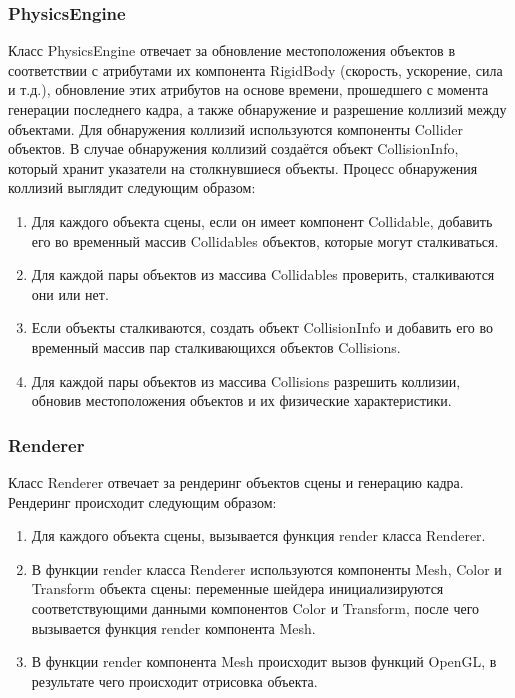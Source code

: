 \subsubsection*{PhysicsEngine}

Класс PhysicsEngine отвечает за обновление местоположения объектов в соответствии с атрибутами их компонента RigidBody (скорость, ускорение, сила и т.д.), обновление этих атрибутов на основе времени, прошедшего с момента генерации последнего кадра, а также обнаружение и разрешение коллизий между объектами.
Для обнаружения коллизий используются компоненты Collider объектов.
В случае обнаружения коллизий создаётся объект CollisionInfo, который хранит указатели на столкнувшиеся объекты.
Процесс обнаружения коллизий выглядит следующим образом:
\begin{enumerate}
    \item Для каждого объекта сцены, если он имеет компонент Collidable, добавить его во временный массив Collidables объектов, которые могут сталкиваться.
    \item Для каждой пары объектов из массива Collidables проверить, сталкиваются они или нет.
    \item Если объекты сталкиваются, создать объект CollisionInfo и добавить его во временный массив пар сталкивающихся объектов Collisions.
    \item Для каждой пары объектов из массива Collisions разрешить коллизии, обновив местоположения объектов и их физические характеристики.
\end{enumerate}

\subsubsection*{Renderer}

Класс Renderer отвечает за рендеринг объектов сцены и генерацию кадра.
Рендеринг происходит следующим образом:
\begin{enumerate}
    \item Для каждого объекта сцены, вызывается функция render класса Renderer.
    \item В функции render класса Renderer используются компоненты Mesh, Color и Transform объекта сцены: переменные шейдера инициализируются соответствующими данными компонентов Color и Transform, после чего вызывается функция render компонента Mesh.
    \item В функции render компонента Mesh происходит вызов функций OpenGL, в результате чего происходит отрисовка объекта.
\end{enumerate}

